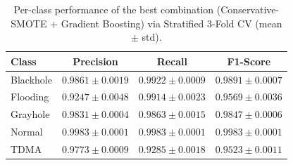 \begin{table}[htbp]
\centering
\caption{Per-class performance of the best combination (Conservative-SMOTE + Gradient Boosting) via Stratified 3-Fold CV (mean $\pm$ std).}
\label{tab:kfold_per_class}
\begin{tabular}{lccc}
\toprule
Class & Precision & Recall & F1-Score \\
\midrule
Blackhole & $0.9861 \pm 0.0019$ & $0.9922 \pm 0.0009$ & $0.9891 \pm 0.0007$ \\
Flooding & $0.9247 \pm 0.0048$ & $0.9914 \pm 0.0023$ & $0.9569 \pm 0.0036$ \\
Grayhole & $0.9831 \pm 0.0004$ & $0.9863 \pm 0.0015$ & $0.9847 \pm 0.0006$ \\
Normal & $0.9983 \pm 0.0001$ & $0.9983 \pm 0.0001$ & $0.9983 \pm 0.0001$ \\
TDMA & $0.9773 \pm 0.0009$ & $0.9285 \pm 0.0018$ & $0.9523 \pm 0.0011$ \\
\bottomrule
\end{tabular}
\end{table}